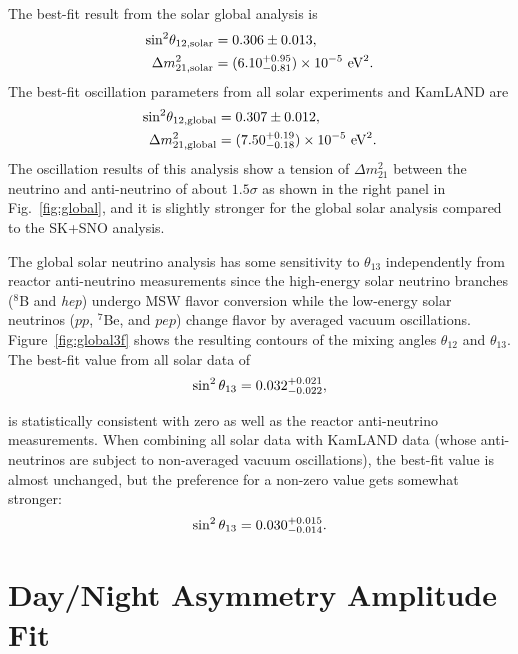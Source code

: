 \documentclass[aps,prd,reprint,superscriptaddress,floatfix,altaffilletter,nofootinbib]{revtex4-2}
\begin{document}
The best-fit result from the solar global analysis is
\begin{align*}
    \rm{sin^{2} \theta_{12,\mathrm{solar}}} & = 0.306 \pm 0.013, \\
    \Delta m^{2}_{21,\mathrm{solar}} &  = (6.10^{+0.95}_{-0.81})  \times 10^{-5}~\rm{eV}^{2}.
\end{align*}
The best-fit oscillation parameters from all solar experiments and KamLAND are
\begin{align*}
    \rm{sin^2 \theta_{12, \mathrm{global}}} & = 0.307 \pm 0.012, \\
    \Delta m^2_{21,\mathrm{global}} & = (7.50^{+ 0.19}_{-0.18})  \times 10^{-5}~\rm{eV}^{2}.
\end{align*}
The oscillation results of this analysis show a tension of $\Delta m_{21}^2$ between the neutrino 
and anti-neutrino of about $1.5\sigma$ as shown in the right panel in Fig.~\ref{fig:global}, 
and it is slightly stronger for the global solar analysis compared to the SK+SNO analysis.

The global solar neutrino analysis has some sensitivity to $\theta_{13}$ independently from reactor anti-neutrino measurements since the high-energy solar neutrino branches ($^{8}$B and {\it hep}) undergo MSW flavor conversion while the low-energy solar neutrinos ($pp$, $^7$Be, and $pep$) change flavor by averaged vacuum oscillations. Figure~\ref{fig:global3f} shows the resulting contours of the mixing angles $\theta_{12}$ and $\theta_{13}$. The best-fit value from all solar data of
\begin{equation}
    \sin^2\theta_{13}=0.032^{+ 0.021}_{-0.022}, \notag
\end{equation}

\noindent is statistically consistent with zero as well as the reactor anti-neutrino measurements. When combining all solar data with KamLAND data (whose anti-neutrinos are subject to non-averaged vacuum oscillations), the best-fit value is almost unchanged, but the preference for a non-zero value gets somewhat stronger:
\begin{equation}
    \sin^2\theta_{13}=0.030^{+ 0.015}_{-0.014}. \notag
\end{equation}


\section{Day/Night Asymmetry Amplitude Fit}
\label{sec:osc_dn}
\end{document}
